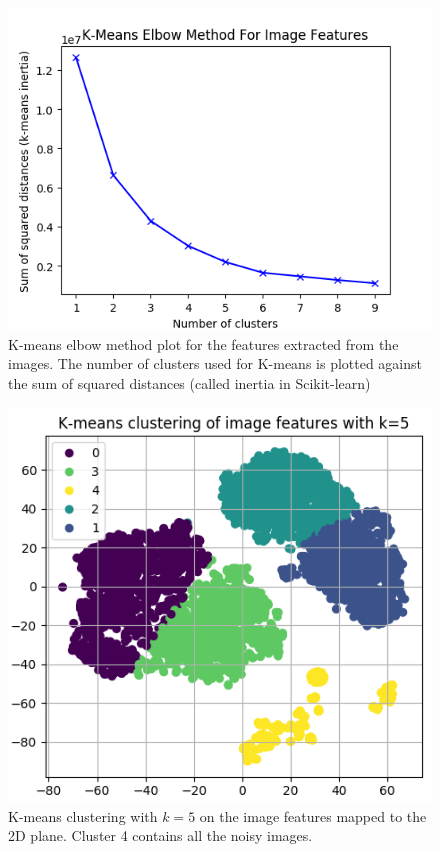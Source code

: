 \documentclass[10pt,twocolumn,letterpaper]{article}
\begin{document}
\begin{figure}[!htbp]
\begin{center}
\includegraphics[width=1\linewidth]{elbow_method.png}
\end{center}
   \caption{K-means elbow method plot for the features extracted from the images. The number of clusters used for K-means is plotted against the sum of squared distances (called inertia in Scikit-learn)}
\label{fig:elbow}
\end{figure}

\begin{figure}[!htbp]
\begin{center}
\includegraphics[width=0.9\linewidth]{clusters.png}
\end{center}
   \caption{K-means clustering with $k=5$ on the image features mapped to the 2D plane. Cluster 4 contains all the noisy images.}
\label{fig:clusters}
\end{figure}
\end{document}
